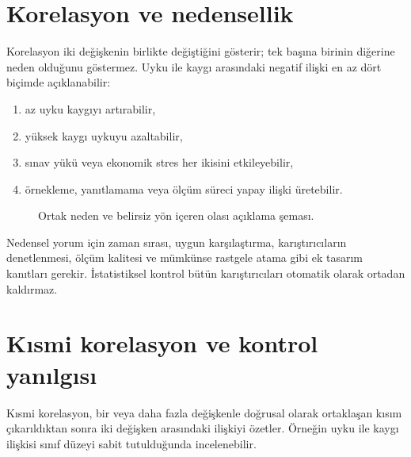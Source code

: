 \section{Korelasyon ve nedensellik}

Korelasyon iki değişkenin birlikte değiştiğini gösterir; tek başına birinin
diğerine neden olduğunu göstermez. Uyku ile kaygı arasındaki negatif ilişki
en az dört biçimde açıklanabilir:

\begin{enumerate}
  \item az uyku kaygıyı artırabilir,
  \item yüksek kaygı uykuyu azaltabilir,
  \item sınav yükü veya ekonomik stres her ikisini etkileyebilir,
  \item örnekleme, yanıtlamama veya ölçüm süreci yapay ilişki üretebilir.
\end{enumerate}

\begin{figure}[htbp]
\centering
{}
\caption{Ortak neden ve belirsiz yön içeren olası açıklama şeması.}
\end{figure}

Nedensel yorum için zaman sırası, uygun karşılaştırma, karıştırıcıların
denetlenmesi, ölçüm kalitesi ve mümkünse rastgele atama gibi ek tasarım
kanıtları gerekir. İstatistiksel kontrol bütün karıştırıcıları otomatik olarak
ortadan kaldırmaz.

\section{Kısmi korelasyon ve kontrol yanılgısı}

Kısmi korelasyon, bir veya daha fazla değişkenle doğrusal olarak ortaklaşan
kısım çıkarıldıktan sonra iki değişken arasındaki ilişkiyi özetler. Örneğin
uyku ile kaygı ilişkisi sınıf düzeyi sabit tutulduğunda incelenebilir.

